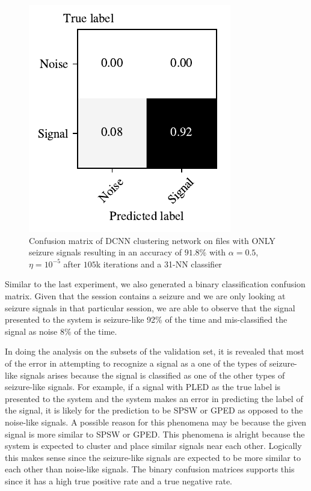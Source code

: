 \begin{figure}[!ht]
	\centering
	\includegraphics[width=0.425\linewidth]{pictures/conf_mat_exp_with_only_seizure_pooled.pdf}
	\caption[Binary Confusion Matrix on Sessions with only Seizure-Like Signals]{Confusion matrix of DCNN clustering network on files with ONLY seizure signals resulting in an accuracy of $91.8\%$ with $\alpha = 0.5$, $\eta = 10^{-5}$ after $105$k iterations and a 31-NN classifier}\label{fig:conf_mat_exp_with_only_seizure_pooled}  
\end{figure}

Similar to the last experiment, we also generated a binary classification confusion matrix. Given that the session contains a seizure and we are only looking at seizure signals in that particular session, we are able to observe that the signal presented to the system is seizure-like 92\% of the time and mis-classified the signal as noise 8\% of the time. 

In doing the analysis on the subsets of the validation set, it is revealed that most of the error in attempting to recognize a signal as a one of the types of seizure-like signals arises because the signal is classified as one of the other types of seizure-like signals. For example, if a signal with PLED as the true label is presented to the system and the system makes an error in predicting the label of the signal, it is likely for the prediction to be SPSW or GPED as opposed to the noise-like signals. A possible reason for this phenomena may be because the given signal is more similar to SPSW or GPED. This phenomena is alright because the system is expected to cluster and place similar signals near each other. Logically this makes sense since the seizure-like signals are expected to be more similar to each other than noise-like signals. The binary confusion matrices supports this since it has a high true positive rate and a true negative rate. 

